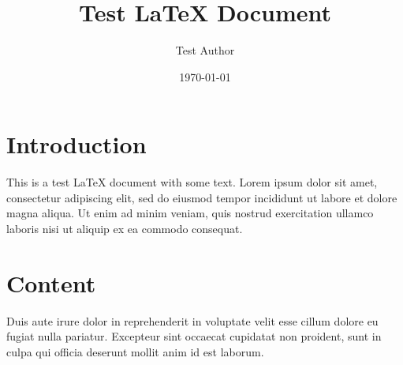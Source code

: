 \documentclass{article}
\title{Test LaTeX Document}
\author{Test Author}
\date{\today}
\begin{document}
\maketitle

\section{Introduction}

This is a test LaTeX document with some text. Lorem ipsum dolor sit amet, consectetur adipiscing elit, sed do eiusmod tempor incididunt ut labore et dolore magna aliqua. Ut enim ad minim veniam, quis nostrud exercitation ullamco laboris nisi ut aliquip ex ea commodo consequat.

\section{Content}

Duis aute irure dolor in reprehenderit in voluptate velit esse cillum dolore eu fugiat nulla pariatur. Excepteur sint occaecat cupidatat non proident, sunt in culpa qui officia deserunt mollit anim id est laborum.
\end{document}
